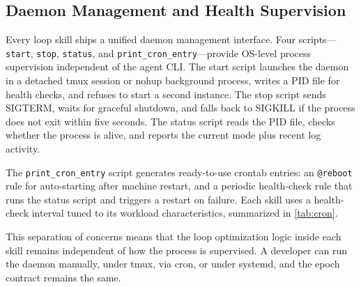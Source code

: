 \subsection{Daemon Management and Health Supervision}

Every loop skill ships a unified daemon management interface. Four scripts---\texttt{start}, \texttt{stop}, \texttt{status}, and \texttt{print\_cron\_entry}---provide OS-level process supervision independent of the agent CLI. The start script launches the daemon in a detached tmux session or nohup background process, writes a PID file for health checks, and refuses to start a second instance. The stop script sends SIGTERM, waits for graceful shutdown, and falls back to SIGKILL if the process does not exit within five seconds. The status script reads the PID file, checks whether the process is alive, and reports the current mode plus recent log activity.

The \texttt{print\_cron\_entry} script generates ready-to-use crontab entries: an \texttt{@reboot} rule for auto-starting after machine restart, and a periodic health-check rule that runs the status script and triggers a restart on failure. Each skill uses a health-check interval tuned to its workload characteristics, summarized in \cref{tab:cron}.

\begin{table}[t]
\centering
\small
{}
\caption{Differential cron health-check intervals. Faster intervals target lightweight or multi-agent skills; slower intervals suit IDE-integrated or long-context skills.}
\label{tab:cron}
\end{table}

This separation of concerns means that the loop optimization logic inside each skill remains independent of how the process is supervised. A developer can run the daemon manually, under tmux, via cron, or under systemd, and the epoch contract remains the same.
